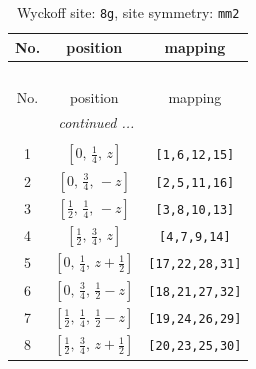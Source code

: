 \documentclass[fleqn,8pt]{jsarticle}
\begin{document}
\begin{longtable}{ccc}
\caption{Wyckoff site: {\tt 8g}, site symmetry: {\tt mm2}}
 \\
 \hline \hline
No. & position & mapping \\ \hline \endfirsthead

\multicolumn{2}{l}{\tablename\ \thetable{}} \\
 \hline \hline
No. & position & mapping \\ \hline \endhead

 \hline \hline
\multicolumn{2}{r}{\footnotesize\it continued ...} \\ \endfoot

 \hline \hline
\multicolumn{2}{r}{} \\ \endlastfoot

1 & $\left[ 0,\, \frac{1}{4},\, z \right]$ & {\tt [1,6,12,15]} \\ \hline
2 & $\left[ 0,\, \frac{3}{4},\, - z \right]$ & {\tt [2,5,11,16]} \\ \hline
3 & $\left[ \frac{1}{2},\, \frac{1}{4},\, - z \right]$ & {\tt [3,8,10,13]} \\ \hline
4 & $\left[ \frac{1}{2},\, \frac{3}{4},\, z \right]$ & {\tt [4,7,9,14]} \\ \hline
5 & $\left[ 0,\, \frac{1}{4},\, z + \frac{1}{2} \right]$ & {\tt [17,22,28,31]} \\ \hline
6 & $\left[ 0,\, \frac{3}{4},\, \frac{1}{2} - z \right]$ & {\tt [18,21,27,32]} \\ \hline
7 & $\left[ \frac{1}{2},\, \frac{1}{4},\, \frac{1}{2} - z \right]$ & {\tt [19,24,26,29]} \\ \hline
8 & $\left[ \frac{1}{2},\, \frac{3}{4},\, z + \frac{1}{2} \right]$ & {\tt [20,23,25,30]} \\
\end{longtable}
\renewcommand{\arraystretch}{1.2}
\end{document}
